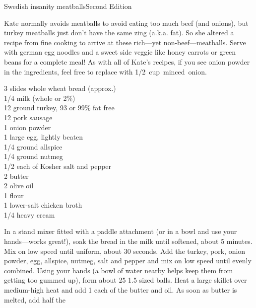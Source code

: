 \begin{entry}{Swedish insanity meatballs}{Second Edition}

\begin{open}
  Kate normally avoids meatballs to avoid eating too much beef (and onions),
  but turkey meatballs just don't have the same zing (a.k.a. fat). So she
  altered a recipe from fine cooking to arrive at these rich---yet
  non-beef---meatballs. Serve with german egg noodles and a sweet side veggie
  like honey carrots or green beans for a complete meal! As with all of Kate's
  recipes, if you see onion powder in the ingredients, feel free to replace
  with \SI{1/2}cup minced onion.
\end{open}
\begin{ingredients}
    3 slides whole wheat bread (approx.)\\
    \SI{1/4}{\cup} milk (whole or 2\%) \\
    \SI{12}{\ounce} ground turkey, 93 or 99\% fat free\\
    \SI{12}{\ounce} pork sausage\\
    \SI{1}{\teaspoon} onion powder\\
    1 large egg, lightly beaten\\
    \SI{1/4}{\teaspoon} ground allspice\\
    \SI{1/4}{\teaspoon} ground nutmeg\\
    \SI{1/2}{\teaspoon} each of Kosher salt and pepper\\
    \SI{2}{\tblspoon} butter\\
    \SI{2}{\tblspoon} olive oil\\
    \SI{1}{\tblspoon} flour\\
    \SI{1}{\cup} lower-salt chicken broth\\
    \SI{1/4}{\cup} heavy cream
\end{ingredients}
In a stand mixer fitted with a paddle attachment (or in a bowl and use your
hands---works great!), soak the bread in the milk until softened, about 5
minutes. Mix on low speed until uniform, about 30 seconds. Add the turkey,
pork, onion powder, egg, allspice, nutmeg, salt and pepper and mix on low
speed until evenly combined. Using your hands (a bowl of water nearby helps
keep them from getting too gummed up), form about 25 \SI{1.5}{\inch} sized
balls. Heat a large skillet over medium-high heat and add \SI{1}{\tblspoon}
each of the butter and oil. As soon as butter is melted, add half the

\end{entry}
